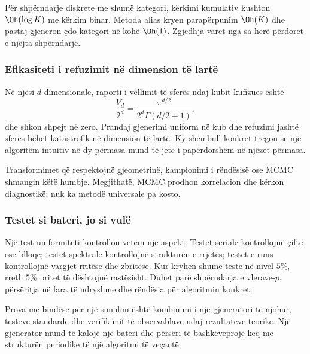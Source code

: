 Për shpërndarje diskrete me shumë kategori, kërkimi kumulativ kushton $\Oh(\log K)$ me kërkim binar. Metoda alias kryen parapërpunim $\Oh(K)$ dhe pastaj gjeneron çdo kategori në kohë $\Oh(1)$. Zgjedhja varet nga sa herë përdoret e njëjta shpërndarje.

\subsubsection{Efikasiteti i refuzimit në dimension të lartë}
Në njësi $d$-dimensionale, raporti i vëllimit të sferës ndaj kubit kufizues është
\begin{equation}
 \frac{V_d}{2^d}=\frac{\pi^{d/2}}{2^d\Gamma(d/2+1)},
\end{equation}
dhe shkon shpejt në zero. Prandaj gjenerimi uniform në kub dhe refuzimi jashtë sferës bëhet katastrofik në dimension të lartë. Ky shembull konkret tregon se një algoritëm intuitiv në dy përmasa mund të jetë i papërdorshëm në njëzet përmasa.

Transformimet që respektojnë gjeometrinë, kampionimi i rëndësisë ose MCMC shmangin këtë humbje. Megjithatë, MCMC prodhon korrelacion dhe kërkon diagnostikë; nuk ka metodë universale pa kosto.

\subsubsection{Testet si bateri, jo si vulë}
Një test uniformiteti kontrollon vetëm një aspekt. Testet seriale kontrollojnë çifte ose blloqe; testet spektrale kontrollojnë strukturën e rrjetës; testet e runs kontrollojnë vargjet rritëse dhe zbritëse. Kur kryhen shumë teste në nivel $5\%$, rreth $5\%$ pritet të dështojnë rastësisht. Duhet parë shpërndarja e vlerave-$p$, përsëritja në fara të ndryshme dhe rëndësia për algoritmin konkret.

Prova më bindëse për një simulim është kombinimi i një gjeneratori të njohur, testeve standarde dhe verifikimit të observablave ndaj rezultateve teorike. Një gjenerator mund të kalojë një bateri dhe përsëri të bashkëveprojë keq me strukturën periodike të një algoritmi të veçantë.
